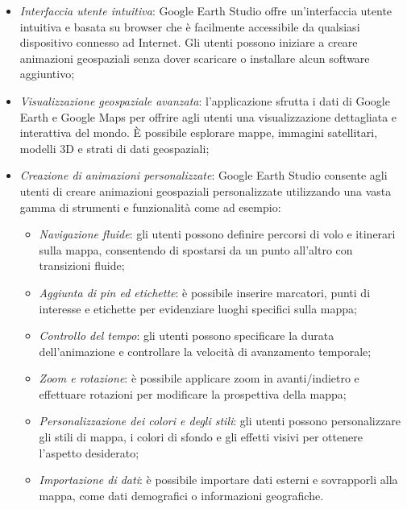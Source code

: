 \begin{itemize}
    \item \textit{Interfaccia utente intuitiva}: Google Earth Studio offre un'interfaccia utente intuitiva e basata su browser che è facilmente accessibile da qualsiasi dispositivo connesso ad Internet. Gli utenti possono iniziare a creare animazioni geospaziali senza dover scaricare o installare alcun software aggiuntivo; 
    \item \textit{Visualizzazione geospaziale avanzata}: l'applicazione sfrutta i dati di Google Earth e Google Maps per offrire agli utenti una visualizzazione dettagliata e interattiva del mondo. È possibile esplorare mappe, immagini satellitari, modelli 3D e strati di dati geospaziali; 
    \item \textit{Creazione di animazioni personalizzate}: Google Earth Studio consente agli utenti di creare animazioni geospaziali personalizzate utilizzando una vasta gamma di strumenti e funzionalità come ad esempio:

    \begin{itemize}
        \item \textit{Navigazione fluide}: gli utenti possono definire percorsi di volo e itinerari sulla mappa, consentendo di spostarsi da un punto all'altro con transizioni fluide;
        \item \textit{Aggiunta di pin ed etichette}: è possibile inserire marcatori, punti di interesse e etichette per evidenziare luoghi specifici sulla mappa;
        \item \textit{Controllo del tempo}: gli utenti possono specificare la durata dell'animazione e controllare la velocità di avanzamento temporale;
        \item \textit{Zoom e rotazione}: è possibile applicare zoom in avanti/indietro e effettuare rotazioni per modificare la prospettiva della mappa;
        \item \textit{Personalizzazione dei colori e degli stili}: gli utenti possono personalizzare gli stili di mappa, i colori di sfondo e gli effetti visivi per ottenere l'aspetto desiderato;
        \item \textit{Importazione di dati}: è possibile importare dati esterni e sovrapporli alla mappa, come dati demografici o informazioni geografiche.     
    \end{itemize}
     

\end{itemize}
